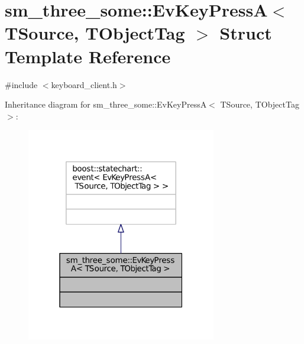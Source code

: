 \hypertarget{structsm__three__some_1_1EvKeyPressA}{}\section{sm\+\_\+three\+\_\+some\+:\+:Ev\+Key\+PressA$<$ T\+Source, T\+Object\+Tag $>$ Struct Template Reference}
\label{structsm__three__some_1_1EvKeyPressA}


{\ttfamily \#include $<$keyboard\+\_\+client.\+h$>$}



Inheritance diagram for sm\+\_\+three\+\_\+some\+:\+:Ev\+Key\+PressA$<$ T\+Source, T\+Object\+Tag $>$\+:
\nopagebreak
\begin{figure}[H]
\begin{center}
\leavevmode
\includegraphics[width=235pt]{structsm__three__some_1_1EvKeyPressA__inherit__graph}
\end{center}
\end{figure}


